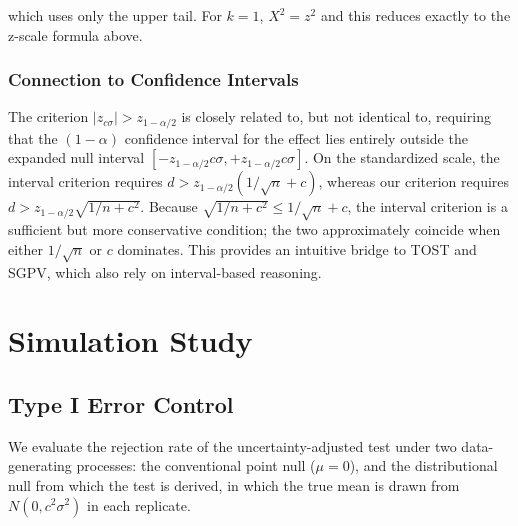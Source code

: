\documentclass[
  11pt,
  letterpaper,
]{article}
\begin{document}
which uses only the upper tail. For \(k = 1\), \(X^2 = z^2\) and this
reduces exactly to the z-scale formula above.

\subsubsection{Connection to Confidence Intervals}\label{sec-ci}

The criterion \(|z_{c\sigma}| > z_{1-\alpha/2}\) is closely related to,
but not identical to, requiring that the \((1-\alpha)\) confidence
interval for the effect lies entirely outside the expanded null interval
\([-z_{1-\alpha/2} c\sigma, +z_{1-\alpha/2} c\sigma]\). On the
standardized scale, the interval criterion requires
\(d > z_{1-\alpha/2}(1/\sqrt{n} + c)\), whereas our criterion requires
\(d > z_{1-\alpha/2}\sqrt{1/n + c^2}\). Because
\(\sqrt{1/n + c^2} \le 1/\sqrt{n} + c\), the interval criterion is a
sufficient but more conservative condition; the two approximately
coincide when either \(1/\sqrt{n}\) or \(c\) dominates. This provides an
intuitive bridge to TOST and SGPV, which also rely on interval-based
reasoning.

\section{Simulation Study}\label{sec-sim}

\subsection{Type I Error Control}\label{type-i-error-control}

We evaluate the rejection rate of the uncertainty-adjusted test under
two data-generating processes: the conventional point null
(\(\mu = 0\)), and the distributional null from which the test is
derived, in which the true mean is drawn from \(N(0, c^2\sigma^2)\) in
each replicate.
\end{document}
